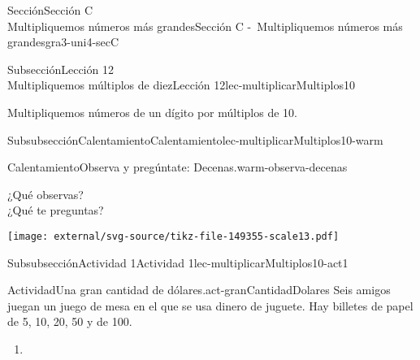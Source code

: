 \begin{sectionptx}{Sección}{{\Large Sección C\\}Multipliquemos números más grandes}{}{Sección C -~Multipliquemos números más grandes}{}{}{gra3-uni4-secC}
%
%
\typeout{************************************************}
\typeout{************************************************}
%
\begin{subsectionptx}{Subsección}{{\normalsize Lección 12\\[-0.05cm]}Multipliquemos múltiplos de diez}{}{Lección 12}{}{}{lec-multiplicarMultiplos10}
\begin{introduction}{}%
Multipliquemos números de un dígito por múltiplos de 10.%
\end{introduction}%
%
%
\typeout{************************************************}
\typeout{************************************************}
%
\begin{subsubsectionptx}{Subsubsección}{Calentamiento}{}{Calentamiento}{}{}{lec-multiplicarMultiplos10-warm}
\begin{exploration}{Calentamiento}{Observa y pregúntate: Decenas.}{warm-observa-decenas}%
\begin{multicols}{2}
¿Qué observas?\\
 ¿Qué te preguntas?%
\vfill\columnbreak
\begin{image}{0}{1}{0}{}%
\texttt{[image: external/svg-source/tikz-file-149355-scale13.pdf]}
\end{image}%
\end{multicols}
\end{exploration}%
\end{subsubsectionptx}
%
%
\typeout{************************************************}
\typeout{************************************************}
%
\begin{subsubsectionptx}{Subsubsección}{Actividad 1}{}{Actividad 1}{}{}{lec-multiplicarMultiplos10-act1}
\begin{activity}{Actividad}{Una gran cantidad de dólares.}{act-granCantidadDolares}%
Seis amigos juegan un juego de mesa en el que se usa dinero de juguete. Hay billetes de papel de \textdollar{}5, \textdollar{}10, \textdollar{}20, \textdollar{}50 y de \textdollar{}100.%
%
\begin{enumerate}
\item{}
\begin{multicols}{2}

\end{multicols}
\end{enumerate}
\end{activity}
\end{subsubsectionptx}
\end{subsectionptx}
\end{sectionptx}
